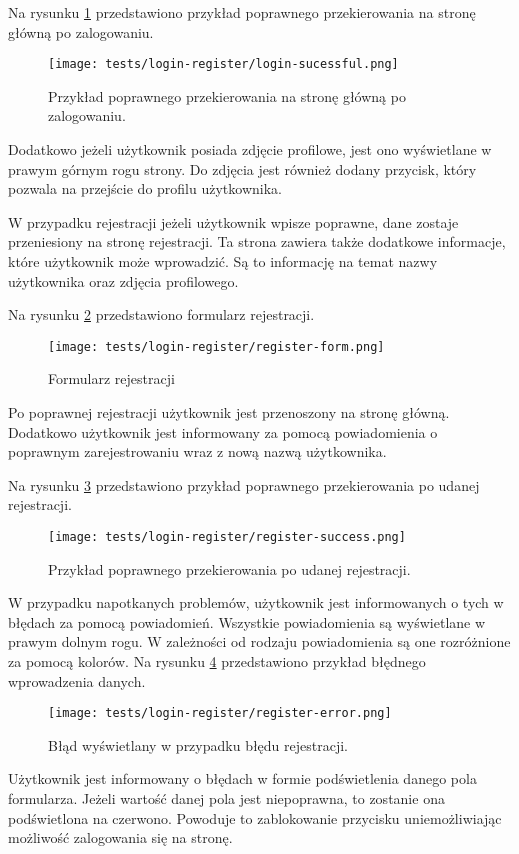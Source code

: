 Na rysunku \ref{login_success} przedstawiono przykład poprawnego przekierowania na stronę główną po zalogowaniu. 
\begin{figure}[H]
  \centering
  \texttt{[image: tests/login-register/login-sucessful.png]}
  \caption{Przykład poprawnego przekierowania na stronę główną po zalogowaniu.}
  \label{login_success}
\end{figure}
Dodatkowo jeżeli użytkownik posiada zdjęcie profilowe, jest ono wyświetlane w prawym górnym rogu strony. Do zdjęcia jest również dodany przycisk, który pozwala na przejście do profilu użytkownika.

W przypadku rejestracji jeżeli użytkownik wpisze poprawne, dane zostaje przeniesiony na stronę rejestracji. Ta strona zawiera także dodatkowe informacje, które użytkownik może wprowadzić. Są to informację na temat nazwy użytkownika oraz zdjęcia profilowego.

Na rysunku \ref{register_page} przedstawiono formularz rejestracji.
\begin{figure}[H]
  \centering
  \texttt{[image: tests/login-register/register-form.png]}
  \caption{Formularz rejestracji}
  \label{register_page}
\end{figure}
Po poprawnej rejestracji użytkownik jest przenoszony na stronę główną. Dodatkowo użytkownik jest informowany za pomocą powiadomienia o poprawnym zarejestrowaniu wraz z nową nazwą użytkownika. 

Na rysunku \ref{success_register} przedstawiono przykład poprawnego przekierowania po udanej rejestracji.
\begin{figure}[H]
  \centering
  \texttt{[image: tests/login-register/register-success.png]}
  \caption{Przykład poprawnego przekierowania po udanej rejestracji.}
  \label{success_register}
\end{figure}
W przypadku napotkanych problemów, użytkownik jest informowanych o tych w błędach za pomocą powiadomień. Wszystkie powiadomienia są wyświetlane w prawym dolnym rogu. W zależności od rodzaju powiadomienia są one rozróżnione za pomocą kolorów. Na rysunku \ref{register_error} przedstawiono przykład błędnego wprowadzenia danych.
\begin{figure}[H]
  \centering
  \texttt{[image: tests/login-register/register-error.png]}
  \caption{Błąd wyświetlany w przypadku błędu rejestracji.}
  \label{register_error}
\end{figure}
Użytkownik jest informowany o błędach w formie podświetlenia danego pola formularza. Jeżeli wartość danej pola jest niepoprawna, to zostanie ona podświetlona na czerwono. Powoduje to zablokowanie przycisku uniemożliwiając możliwość zalogowania się na stronę.


